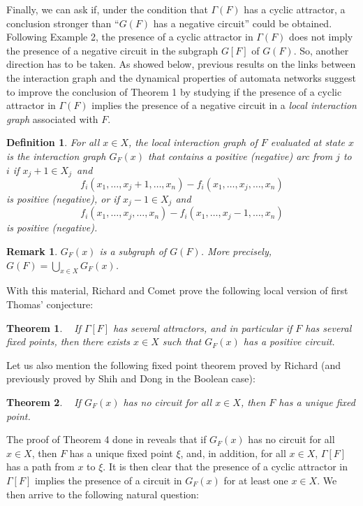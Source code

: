 \documentclass[11pt]{article}
\newtheorem{definition}{Definition}
\newtheorem{theorem}{Theorem}
\newtheorem{remark}{Remark}
\begin{document}
Finally, we can ask if, under the condition that $\Gamma(F)$ has a
cyclic attractor, a conclusion stronger than ``$G(F)$ has a negative
circuit'' could be obtained. Following Example 2, the presence of a
cyclic attractor in $\Gamma(F)$ does not imply the presence of a
negative circuit in the subgraph $G[F]$ of $G(F)$. So, another
direction has to be taken. As showed below, previous results on
the links between the interaction graph and the dynamical properties of
automata networks suggest to improve the conclusion of Theorem 1 by
studying if the presence of a cyclic attractor in $\Gamma(F)$ implies
the presence of a negative circuit in a {\emph{local interaction
graph}} associated with $F$.

\begin{definition}
For all $x\in X$, the {\emph{local interaction graph of $F$ evaluated
at state $x$}} is the interaction graph $G_F(x)$ that contains a
positive (negative) arc from $j$ to $i$ if $x_j+1\in X_j$~and
\[
f_i(x_1,\dots,x_j+1,\dots,x_n)-f_i(x_1,\dots,x_j,\dots,x_n)
\]
is positive (negative), or if $x_j-1\in X_j$ and 
\[
f_i(x_1,\dots,x_j,\dots,x_n)-f_i(x_1,\dots,x_j-1,\dots,x_n)
\]
is positive (negative).
\end{definition}


\begin{remark}
$G_F(x)$ is a subgraph of $G(F)$. More precisely, $G(F)=\bigcup_{x\in
X} G_F(x)$.
\end{remark}
With this material, Richard and Comet {\cite{RC07}} prove the
following local version of first Thomas' conjecture:

\begin{theorem}{\bf{\cite{RC07}}}~
If $\Gamma[F]$ has several attractors, and in particular if $F$ has
several fixed points, then there exists $x\in X$ such that $G_F(x)$
has a positive circuit.
\end{theorem}
Let us also mention the following fixed point theorem proved by
Richard {\cite{R08}} (and previously proved by Shih and Dong
{\cite{SD05}} in the Boolean case):

\begin{theorem}{\bf{\cite{R08}}}~
If $G_F(x)$ has no circuit for all $x\in X$, then $F$ has a unique
fixed point.
\end{theorem}
The proof of Theorem 4 done in {\cite{R08}} reveals that if $G_F(x)$
has no circuit for all $x\in X$, then $F$ has a unique fixed point
$\xi$, and, in addition, for all $x\in X$, $\Gamma[F]$ has a path from
$x$ to $\xi$. It is then clear that the presence of a cyclic attractor
in $\Gamma[F]$ implies the presence of a circuit in $G_F(x)$ for at
least one $x\in X$. We then arrive to the following natural question:
\end{document}
